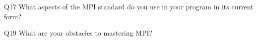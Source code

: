 \begin{description}%
\item{Q17} What aspects of the MPI standard do you use in your program in its current form?%
\item{Q19} What are your obstacles to mastering MPI?%
\end{description}%
